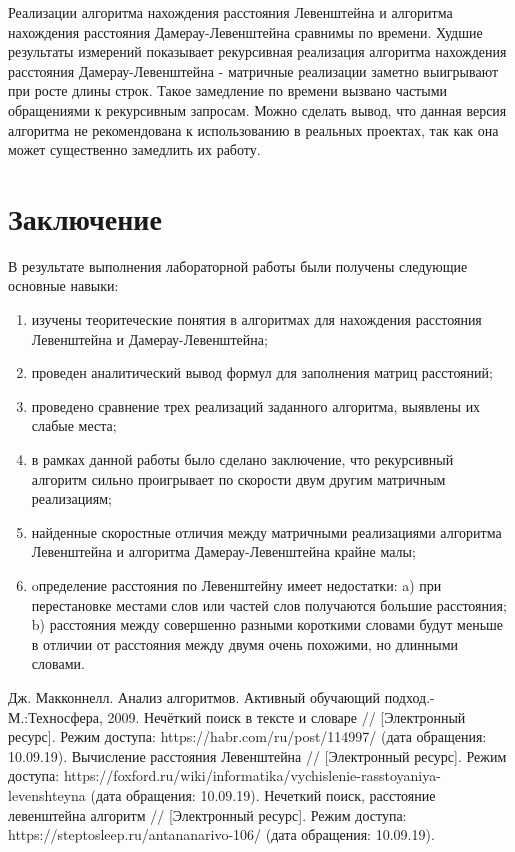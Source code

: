 \documentclass[a4paper, 14pt]{article}
\begin{document}
	Реализации алгоритма нахождения расстояния Левенштейна и алгоритма нахождения расстояния Дамерау-Левенштейна сравнимы по времени. Худшие результаты измерений показывает рекурсивная реализация алгоритма нахождения расстояния Дамерау-Левенштейна - матричные реализации заметно выигрывают при росте длины строк. Такое замедление по времени вызвано частыми обращениями к рекурсивным запросам. Можно сделать вывод, что данная версия алгоритма не рекомендована к использованию в реальных проектах, так как она может существенно замедлить их работу.
	
	\newpage
	\section*{Заключение}
	
 
	В результате выполнения лабораторной работы были получены следующие основные навыки:
	\begin{enumerate}
\item изучены теоритеческие понятия в алгоритмах для нахождения расстояния Левенштейна и Дамерау-Левенштейна;
\item проведен аналитический вывод формул для заполнения матриц расстояний;
\item проведено сравнение трех реализаций заданного алгоритма, выявлены их слабые места;
\item в рамках данной работы было сделано заключение, что рекурсивный алгоритм сильно проигрывает по скорости двум другим матричным реализациям;
\item найденные скоростные отличия между матричными реализациями алгоритма Левенштейна и алгоритма Дамерау-Левенштейна крайне малы;
\item oпределение расстояния по Левенштейну имеет недостатки: a) при перестановке местами слов или частей слов получаются большие расстояния; b) расстояния между совершенно разными короткими словами будут меньше в отличии от расстояния между двумя очень похожими, но длинными словами.
	\end{enumerate}

\newpage
{}

\begin{thebibliography}{}
      Дж. Макконнелл. Анализ алгоритмов. Активный обучающий подход.-М.:Техносфера, 2009.
     Нечёткий поиск в тексте и словаре // [Электронный ресурс]. Режим доступа: https://habr.com/ru/post/114997/ (дата обращения: 10.09.19).
    Вычисление расстояния Левенштейна // [Электронный ресурс]. Режим доступа: https://foxford.ru/wiki/informatika/vychislenie-rasstoyaniya-levenshteyna (дата обращения: 10.09.19).
    Нечеткий поиск, расстояние левенштейна алгоритм // [Электронный ресурс]. Режим доступа: https://steptosleep.ru/antananarivo-106/ (дата обращения: 10.09.19).
\end{thebibliography}
	
	\newpage
	
	
	
\end{document}
